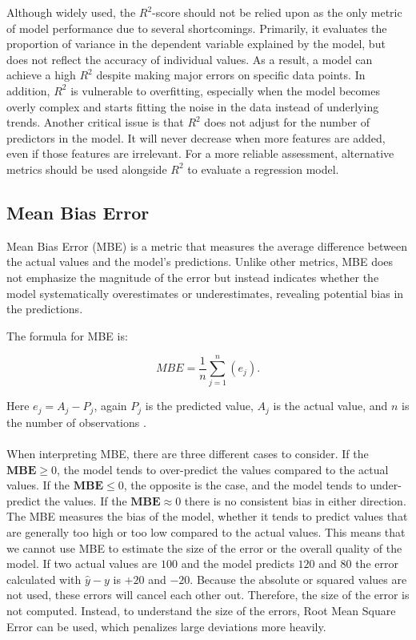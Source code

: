 \noindent Although widely used, the $R^2$-score should not be relied upon as the only metric of model performance due to several shortcomings. Primarily, it evaluates the proportion of variance in the dependent variable explained by the model, but does not reflect the accuracy of individual values. As a result, a model can achieve a high $R^2$ despite making major errors on specific data points. In addition, $R^2$ is vulnerable to overfitting, especially when the model becomes overly complex and starts fitting the noise in the data instead of underlying trends. Another critical issue is that $R^2$ does not adjust for the number of predictors in the model. It will never decrease when more features are added, even if those features are irrelevant. For a more reliable assessment, alternative metrics should be used alongside $R^2$ to evaluate a regression model. 
\newpage

\subsection{Mean Bias Error}
Mean Bias Error (MBE) is a metric that measures the average difference between the actual values and the model's predictions. Unlike other metrics, MBE does not emphasize the magnitude of the error but instead indicates whether the model systematically overestimates or underestimates, revealing potential bias in the predictions.

The formula for MBE is:

$$MBE=\frac{1}{n}\sum_{j=1}^{n}(e_{j}).$$

\noindent Here $e_{j}=A_{j}-P_{j}$, again $P_{j}$ is the predicted value, $A_{j}$ is the actual value, and $n$ is the number of observations \cite{metrics}.
\\\\

When interpreting MBE, there are three different cases to consider. If the $\textbf{MBE}\geq 0$, the model tends to over-predict the values compared to the actual values. If the $\textbf{MBE}\leq0$, the opposite is the case, and the model tends to under-predict the values. If the $\textbf{MBE}\approx0$ there is no consistent bias in either direction.
\\

\noindent The MBE measures the bias of the model, whether it tends to predict values that are generally too high or too low compared to the actual values. This means that we cannot use MBE to estimate the size of the error or the overall quality of the model. If two actual values are $100$ and the model predicts $120$ and $80$ the error calculated with $\hat{y}-y$ is $+20$ and $-20$. Because the absolute or squared values are not used, these errors will cancel each other out. Therefore, the size of the error is not computed. Instead, to understand the size of the errors, Root Mean Square Error can be used, which penalizes large deviations more heavily.

